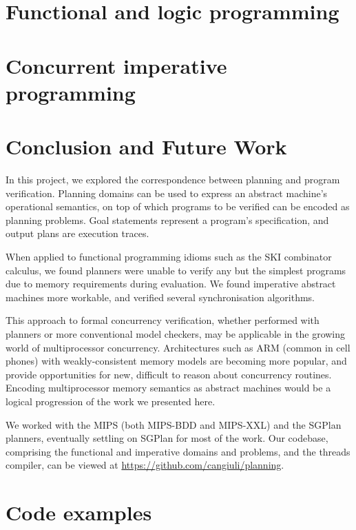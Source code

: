 \documentclass{article}
\begin{document}
\section{Functional and logic programming}



\section{Concurrent imperative programming}



\section{Conclusion and Future Work}

In this project, we explored the correspondence between planning and program verification. Planning domains can be used to express an abstract machine's operational semantics, on top of which programs to be verified can be encoded as planning problems. Goal statements represent a program's specification, and output plans are execution traces.

When applied to functional programming idioms such as the SKI combinator calculus, we found planners were unable to verify any but the simplest programs due to memory requirements during evaluation. We found imperative abstract machines more workable, and verified several synchronisation algorithms.

This approach to formal concurrency verification, whether performed with planners or more conventional model checkers, may be applicable in the growing world of multiprocessor concurrency. Architectures such as ARM (common in cell phones) with weakly-consistent memory models are becoming more popular, and provide opportunities for new, difficult to reason about concurrency routines. Encoding multiprocessor memory semantics as abstract machines would be a logical progression of the work we presented here.

\vspace{1em}
We worked with the MIPS (both MIPS-BDD and MIPS-XXL) and the SGPlan planners, eventually settling on SGPlan for most of the work. Our codebase, comprising the functional and imperative domains and problems, and the threads compiler, can be viewed at \url{https://github.com/cangiuli/planning}.

{}


\newpage

\appendix
\section{Code examples}

\end{document}
